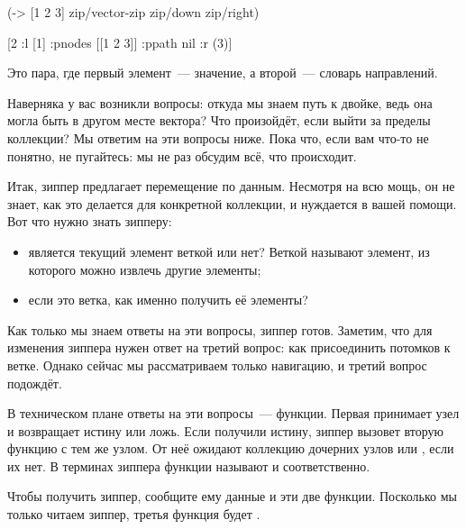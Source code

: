 \begin{english}
  \begin{clojure}
(-> [1 2 3]
    zip/vector-zip
    zip/down
    zip/right)

[2 {:l [1]
    :pnodes [[1 2 3]]
    :ppath nil
    :r (3)}]
  \end{clojure}
\end{english}

Это пара, где первый элемент~--- значение, а второй~--- словарь направлений.

Наверняка у вас возникли вопросы: откуда мы знаем путь к двойке, ведь она могла
быть в другом месте вектора? Что произойдёт, если выйти за пределы коллекции?
Мы ответим на эти вопросы ниже. Пока что, если вам что-то не понятно, не
пугайтесь: мы не раз обсудим всё, что происходит.

Итак, зиппер предлагает перемещение по данным. Несмотря на всю мощь, он не
знает, как это делается для конкретной коллекции, и нуждается в вашей
помощи. Вот что нужно знать зипперу:

\begin{itemize}

\item
  является текущий элемент веткой или нет? Веткой называют элемент, из
  которого можно извлечь другие элементы;

\item
  если это ветка, как именно получить её элементы?

\end{itemize}

\pagebreaklarge

Как только мы знаем ответы на эти вопросы, зиппер готов. Заметим, что для
изменения зиппера нужен ответ на третий вопрос: как присоединить потомков к
ветке. Однако сейчас мы рассматриваем только навигацию, и третий вопрос
подождёт.


В техническом плане ответы на эти вопросы~--- функции. Первая принимает узел и
возвращает истину или ложь. Если получили истину, зиппер вызовет вторую функцию
с тем же узлом. От неё ожидают коллекцию дочерних узлов или , если их
нет. В терминах зиппера функции называют  и 
соответственно.

Чтобы получить зиппер, сообщите ему данные и эти две функции. Посколько мы
только читаем зиппер, третья функция будет .

\def\urlclojurezip{https://github.com/clojure/clojure/blob/master/src/clj/clojure/zip.clj}

